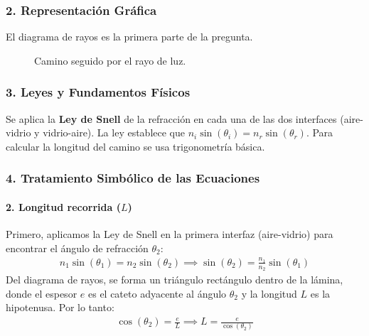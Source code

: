 \subsubsection*{2. Representación Gráfica}
El diagrama de rayos es la primera parte de la pregunta.
\begin{figure}[H]
    \centering
    \caption{Camino seguido por el rayo de luz.}
\end{figure}

\subsubsection*{3. Leyes y Fundamentos Físicos}
Se aplica la \textbf{Ley de Snell} de la refracción en cada una de las dos interfaces (aire-vidrio y vidrio-aire). La ley establece que $n_i \sin(\theta_i) = n_r \sin(\theta_r)$. Para calcular la longitud del camino se usa trigonometría básica.

\subsubsection*{4. Tratamiento Simbólico de las Ecuaciones}
\paragraph{2. Longitud recorrida ($L$)}
Primero, aplicamos la Ley de Snell en la primera interfaz (aire-vidrio) para encontrar el ángulo de refracción $\theta_2$:
\begin{gather}
    n_1 \sin(\theta_1) = n_2 \sin(\theta_2) \implies \sin(\theta_2) = \frac{n_1}{n_2}\sin(\theta_1)
\end{gather}
Del diagrama de rayos, se forma un triángulo rectángulo dentro de la lámina, donde el espesor $e$ es el cateto adyacente al ángulo $\theta_2$ y la longitud $L$ es la hipotenusa. Por lo tanto:
\begin{gather}
    \cos(\theta_2) = \frac{e}{L} \implies L = \frac{e}{\cos(\theta_2)}
\end{gather}

